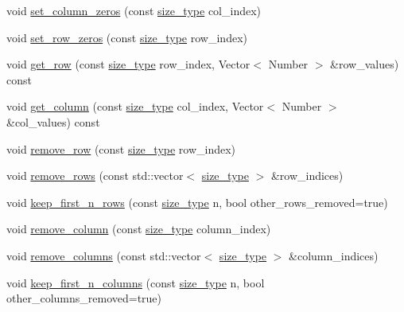 \begin{DoxyCompactItemize}
void \hyperlink{classLAPACKFullMatrixExt_a0ee8a3f97dc3f391f9c963d6a275a25b}{set\+\_\+column\+\_\+zeros} (const \hyperlink{classLAPACKFullMatrixExt_a5cf5f4a6104dc17029210b5ca52bf574}{size\+\_\+type} col\+\_\+index)
\item 
void \hyperlink{classLAPACKFullMatrixExt_abf191c72c4a8813470f32c6107f2ffbc}{set\+\_\+row\+\_\+zeros} (const \hyperlink{classLAPACKFullMatrixExt_a5cf5f4a6104dc17029210b5ca52bf574}{size\+\_\+type} row\+\_\+index)
\item 
void \hyperlink{classLAPACKFullMatrixExt_abc010374ccacc6d1e482196af807d247}{get\+\_\+row} (const \hyperlink{classLAPACKFullMatrixExt_a5cf5f4a6104dc17029210b5ca52bf574}{size\+\_\+type} row\+\_\+index, Vector$<$ Number $>$ \&row\+\_\+values) const
\item 
void \hyperlink{classLAPACKFullMatrixExt_a1d1f6836c88ae08fa79bf6c63f7a3184}{get\+\_\+column} (const \hyperlink{classLAPACKFullMatrixExt_a5cf5f4a6104dc17029210b5ca52bf574}{size\+\_\+type} col\+\_\+index, Vector$<$ Number $>$ \&col\+\_\+values) const
\item 
void \hyperlink{classLAPACKFullMatrixExt_a28fcbdee16b201644ef5c1a7beccfeb6}{remove\+\_\+row} (const \hyperlink{classLAPACKFullMatrixExt_a5cf5f4a6104dc17029210b5ca52bf574}{size\+\_\+type} row\+\_\+index)
\item 
void \hyperlink{classLAPACKFullMatrixExt_a98d770a58dd87d57a3763f55e0b45502}{remove\+\_\+rows} (const std\+::vector$<$ \hyperlink{classLAPACKFullMatrixExt_a5cf5f4a6104dc17029210b5ca52bf574}{size\+\_\+type} $>$ \&row\+\_\+indices)
\item 
void \hyperlink{classLAPACKFullMatrixExt_a6cb733ec47cbcb9fed535362616d7e07}{keep\+\_\+first\+\_\+n\+\_\+rows} (const \hyperlink{classLAPACKFullMatrixExt_a5cf5f4a6104dc17029210b5ca52bf574}{size\+\_\+type} n, bool other\+\_\+rows\+\_\+removed=true)
\item 
void \hyperlink{classLAPACKFullMatrixExt_a4b4bb2b69261608f54c42f329d272195}{remove\+\_\+column} (const \hyperlink{classLAPACKFullMatrixExt_a5cf5f4a6104dc17029210b5ca52bf574}{size\+\_\+type} column\+\_\+index)
\item 
void \hyperlink{classLAPACKFullMatrixExt_acf4f82469289156a7d3993def0481152}{remove\+\_\+columns} (const std\+::vector$<$ \hyperlink{classLAPACKFullMatrixExt_a5cf5f4a6104dc17029210b5ca52bf574}{size\+\_\+type} $>$ \&column\+\_\+indices)
\item 
void \hyperlink{classLAPACKFullMatrixExt_a9c94fd182607dca5b2aa56bca4eb0523}{keep\+\_\+first\+\_\+n\+\_\+columns} (const \hyperlink{classLAPACKFullMatrixExt_a5cf5f4a6104dc17029210b5ca52bf574}{size\+\_\+type} n, bool other\+\_\+columns\+\_\+removed=true)

\end{DoxyCompactItemize}

